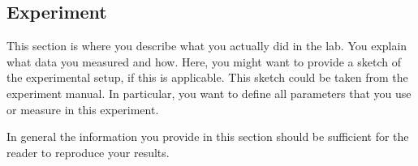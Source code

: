 \subsection{Experiment}

This section is where you describe what you actually did in the lab.
You explain what data you measured and how. Here, you might want to
provide a sketch of the experimental setup, if this is applicable.
This sketch could be taken from the experiment manual. In particular,
you want to define all parameters that you use or measure in this
experiment.

In general the information you provide in this section should be
sufficient for the reader to reproduce your results.